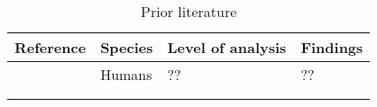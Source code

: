 \begin{table}[h]
\centering
\footnotesize
\caption{Prior literature}
\label{tbl_literature}

\begin{tabularx}{\linewidth}{XXXX}
\toprule
Reference & Species & Level of analysis & Findings \\
\midrule
        \textcite{Placeholder1000}  &  Humans &  ??  & ?? \\
          &         &                  &          \\
          &         &                  &          \\
\bottomrule
\end{tabularx}

\end{table}